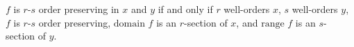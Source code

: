 $f$ is $r$-$s$ order preserving in $x$ and $y$ if and only if $r$ well-orders $x$, $s$ well-orders $y$, $f$ is $r$-$s$ order preserving, $\text{domain } f$ is an $r$-section of $x$, and $\text{range } f$ is an $s$-section of $y$.
